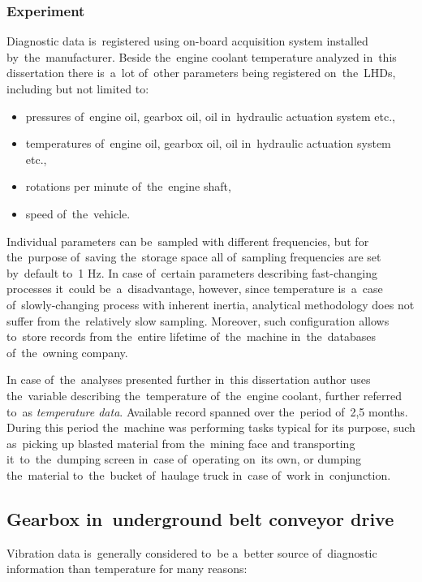 \subsubsection{Experiment}
Diagnostic data is~registered using on-board acquisition system installed by~the~manufacturer. Beside the~engine coolant temperature analyzed in~this dissertation there is~a~lot of~other parameters being registered on~the~LHDs, including but not limited to:
\begin{itemize}
  \item pressures of~engine oil, gearbox oil, oil in~hydraulic actuation system etc.,
  \item temperatures of~engine oil, gearbox oil, oil in~hydraulic actuation system etc.,
  \item rotations per minute of~the~engine shaft,
  \item speed of~the~vehicle.
\end{itemize}

Individual parameters can be~sampled with different frequencies, but for the~purpose of~saving the~storage space all of~sampling frequencies are set by~default to~1 Hz. In case of~certain parameters describing fast-changing processes it~could be~a~disadvantage, however, since temperature is~a~case of~slowly-changing process with inherent inertia, analytical methodology does not suffer from the~relatively slow sampling. Moreover, such configuration allows to~store records from the~entire lifetime of~the~machine in~the~databases of~the~owning company.

In case of~the~analyses presented further in~this dissertation author uses the~variable describing the~temperature of~the~engine coolant, further referred to~as \emph{temperature data}. Available record spanned over the~period of~2,5 months. During this period the~machine was performing tasks typical for its purpose, such as~picking up blasted material from the~mining face and transporting it~to~the~dumping screen in~case of~operating on~its own, or dumping the~material to~the~bucket of~haulage truck in~case of~work in~conjunction.

\subsection{Gearbox in~underground belt conveyor drive}

Vibration data is~generally considered to~be a~better source of~diagnostic information than temperature for many reasons:

